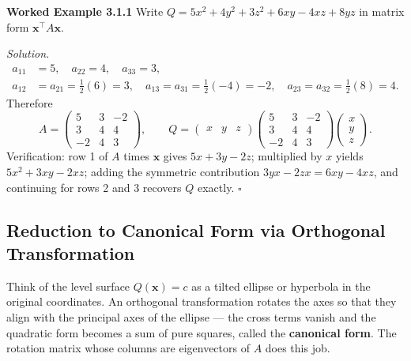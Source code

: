\documentclass[12pt,a4paper]{article}
\begin{document}
\textbf{Worked Example 3.1.1} Write $Q = 5x^{2} + 4y^{2} + 3z^{2} + 6xy - 4xz + 8yz$ in matrix form $\mathbf{x}^{\top}A\mathbf{x}$.

\textit{Solution.}
\begin{align*}
a_{11} &= 5,\quad a_{22}=4,\quad a_{33}=3,\\
a_{12} &= a_{21} = \tfrac{1}{2}(6) = 3,\quad
a_{13} = a_{31} = \tfrac{1}{2}(-4) = -2,\quad
a_{23} = a_{32} = \tfrac{1}{2}(8) = 4.
\end{align*}
Therefore
\[
  A = \begin{pmatrix} 5 & 3 & -2 \\ 3 & 4 & 4 \\ -2 & 4 & 3 \end{pmatrix}, \qquad
  Q = \begin{pmatrix} x & y & z \end{pmatrix}
      \begin{pmatrix} 5 & 3 & -2 \\ 3 & 4 & 4 \\ -2 & 4 & 3 \end{pmatrix}
      \begin{pmatrix} x \\ y \\ z \end{pmatrix}.
\]
Verification: row 1 of $A$ times $\mathbf{x}$ gives $5x+3y-2z$; multiplied by $x$ yields $5x^{2}+3xy-2xz$; adding the symmetric contribution $3yx - 2zx = 6xy - 4xz$, and continuing for rows 2 and 3 recovers $Q$ exactly. \hfill$\square$

\subsection{Reduction to Canonical Form via Orthogonal Transformation}

Think of the level surface $Q(\mathbf{x}) = c$ as a tilted ellipse or hyperbola in the original coordinates. An orthogonal transformation rotates the axes so that they align with the principal axes of the ellipse --- the cross terms vanish and the quadratic form becomes a sum of pure squares, called the \textbf{canonical form}. The rotation matrix whose columns are eigenvectors of $A$ does this job.
\end{document}
